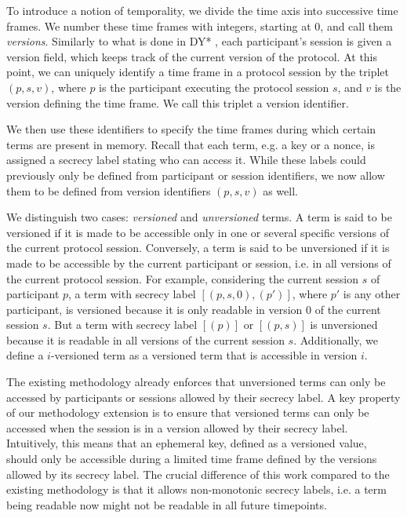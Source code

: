 To introduce a notion of temporality, we divide the time axis into successive time frames. We number these time frames with integers, starting at $0$, and call them \emph{versions}.
Similarly to what is done in DY* \cite{}, each participant's session is given a version field, which keeps track of the current version of the protocol.
At this point, we can uniquely identify a time frame in a protocol session by the triplet $(p, s, v)$, where $p$ is the participant executing the protocol session $s$, and $v$ is the version defining the time frame. We call this triplet a version identifier.

We then use these identifiers to specify the time frames during which certain terms are present in memory.
Recall that each term, e.g. a key or a nonce, is assigned a secrecy label stating who can access it. While these labels could previously only be defined from participant or session identifiers, we now allow them to be defined from version identifiers $(p, s, v)$ as well.

We distinguish two cases: \emph{versioned} and \emph{unversioned} terms.
A term is said to be versioned if it is made to be accessible only in one or several specific versions of the current protocol session.
Conversely, a term is said to be unversioned if it is made to be accessible by the current participant or session, i.e. in all versions of the current protocol session.
For example, considering the current session $s$ of participant $p$, a term with secrecy label $[(p, s, 0), (p')]$, where $p'$ is any other participant, is versioned because it is only readable in version $0$ of the current session $s$. But a term with secrecy label $[(p)]$ or $[(p, s)]$ is unversioned because it is readable in all versions of the current session $s$.
Additionally, we define a $i$-versioned term as a versioned term that is accessible in version $i$.

The existing methodology already enforces that unversioned terms can only be accessed by participants or sessions allowed by their secrecy label.
A key property of our methodology extension is to ensure that versioned terms can only be accessed when the session is in a version allowed by their secrecy label. Intuitively, this means that an ephemeral key, defined as a versioned value, should only be accessible during a limited time frame defined by the versions allowed by its secrecy label.
The crucial difference of this work compared to the existing methodology is that it allows non-monotonic secrecy labels, i.e. a term being readable now might not be readable in all future timepoints.

